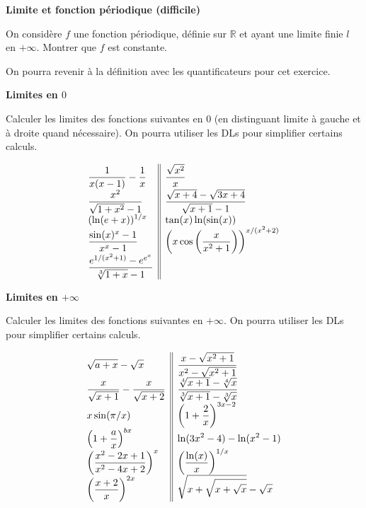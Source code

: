 \documentclass[a4paper,12pt]{article}
\newenvironment{disarray}%
 {\everymath{\displaystyle\everymath{}}\array}%
 {\endarray}
\begin{document}
\Exo \textbf{Limite et fonction périodique (difficile)}

On considère $f$ une fonction périodique, définie sur $\mathbb{R}$ et ayant une limite finie $l$ en $+\infty$. Montrer que $f$ est constante.

On pourra revenir à la définition avec les quantificateurs pour cet exercice.

\Exo \textbf{Limites en $0$}

Calculer les limites des fonctions suivantes en $0$ (en distinguant limite à gauche et à droite quand nécessaire). On pourra utiliser les DLs pour simplifier certains calculs.

\begin{equation*}
  \begin{disarray}{l||l}
    \frac{1}{x(x-1)} - \frac{1}{x} & \frac{\sqrt{x^2}}{x} \\
    \frac{x^2}{\sqrt{1+x^2} - 1} & \frac{\sqrt{x+4} - \sqrt{3x+4}}{\sqrt{x+1} - 1} \\
    (\ln(e+x))^{1/x} & \tan(x) \ln(\sin(x)) \\
    \frac{\sin(x)^x - 1}{x^x - 1} & \left(x \cos\left( \frac{x}{x^2 + 1}\right) \right)^{x/(x^2+2)} \\
    \frac{e^{1/(x^2+1)} - e^{e^x}}{\sqrt[3]{1+x} - 1} &
  \end{disarray}
\end{equation*}

\Exo \textbf{Limites en $+\infty$}

Calculer les limites des fonctions suivantes en $+\infty$. On pourra utiliser les DLs pour simplifier certains calculs.

\begin{equation*}
  \begin{disarray}{l||l}
    \sqrt{a+x} - \sqrt{x} & \frac{x - \sqrt{x^2+1}}{x^2 - \sqrt{x^2+1}} \\
    \frac{x}{\sqrt{x+1}} - \frac{x}{\sqrt{x+2}} & \frac{\sqrt[4]{x+1} - \sqrt[4]{x}}{\sqrt[3]{x+1} - \sqrt[3]{x}} \\
    x \sin(\pi/x) & \left( 1 + \frac{2}{x} \right)^{3x-2} \\
    \left( 1 + \frac{a}{x} \right)^{bx} & \ln(3x^2 - 4) - \ln(x^2 - 1) \\
    \left( \frac{x^2 - 2x + 1}{x^2 - 4x + 2} \right)^x & \left( \frac{\ln(x)}{x} \right)^{1/x} \\
    \left( \frac{x+2}{x} \right)^{2x} & \sqrt{x + \sqrt{x + \sqrt{x}}} - \sqrt{x} \\
  \end{disarray}
\end{equation*}
\end{document}
